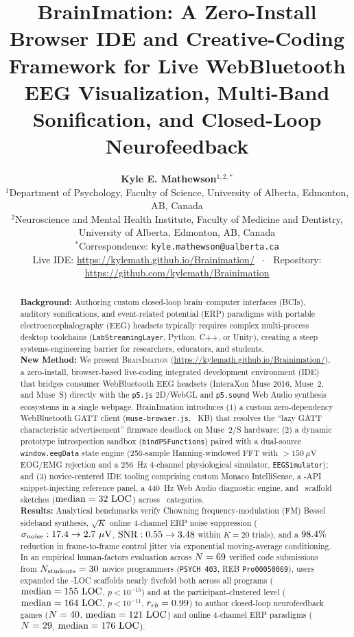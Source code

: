 \documentclass[10pt,twocolumn]{article}
\title{\textbf{BrainImation: A Zero-Install Browser IDE and Creative-Coding Framework for Live WebBluetooth EEG Visualization, Multi-Band Sonification, and Closed-Loop Neurofeedback}}
\author{
\textbf{Kyle E. Mathewson}$^{1,2,*}$\\[4pt]
\footnotesize $^1$Department of Psychology, Faculty of Science, University of Alberta, Edmonton, AB, Canada\\
\footnotesize $^2$Neuroscience and Mental Health Institute, Faculty of Medicine and Dentistry, University of Alberta, Edmonton, AB, Canada\\
\footnotesize $^*$Correspondence: \texttt{kyle.mathewson@ualberta.ca}\\
\footnotesize Live IDE: \url{https://kylemath.github.io/Brainimation/} \ $\cdot$ \ Repository: \url{https://github.com/kylemath/Brainimation}
}
\date{}
\begin{document}
\maketitle

\begin{abstract}
\noindent\textbf{Background:} Authoring custom closed-loop brain--computer interfaces (BCIs), auditory sonifications, and event-related potential (ERP) paradigms with portable electroencephalography (EEG) headsets typically requires complex multi-process desktop toolchains (\texttt{LabStreamingLayer}, Python, C++, or Unity), creating a steep systems-engineering barrier for researchers, educators, and students.\\
\noindent\textbf{New Method:} We present \textsc{BrainImation} (\url{https://kylemath.github.io/Brainimation/}), a zero-install, browser-based live-coding integrated development environment (IDE) that bridges consumer WebBluetooth EEG headsets (InteraXon Muse 2016, Muse~2, and Muse~S) directly with the \texttt{p5.js} 2D/WebGL and \texttt{p5.sound} Web Audio synthesis ecosystems in a single webpage. BrainImation introduces (1) a custom zero-dependency WebBluetooth GATT client (\texttt{muse-browser.js}, \MuseBrowserKB~KB) that resolves the ``lazy GATT characteristic advertisement'' firmware deadlock on Muse~2/S hardware; (2) a dynamic prototype introspection sandbox (\texttt{bindP5Functions}) paired with a dual-source \texttt{window.eegData} state engine (256-sample Hanning-windowed FFT with $>150\ \mu\text{V}$ EOG/EMG rejection and a 256~Hz 4-channel physiological simulator, \texttt{EEGSimulator}); and (3) novice-centered IDE tooling comprising custom Monaco IntelliSense, a \NRefAPIs-API snippet-injecting reference panel, a 440~Hz Web Audio diagnostic engine, and \NBuiltinExamples\ scaffold sketches ($\text{median} = 32\text{ LOC}$) across \NBuiltinCategories\ categories.\\
\noindent\textbf{Results:} Analytical benchmarks verify Chowning frequency-modulation (FM) Bessel sideband synthesis, $\sqrt{K}$ online 4-channel ERP noise suppression ($\sigma_{\text{noise}}: 17.4 \rightarrow 2.7\ \mu\text{V}$, $\text{SNR}: 0.55 \rightarrow 3.48$ within $K=20$ trials), and a $98.4\%$ reduction in frame-to-frame control jitter via exponential moving-average conditioning. In an empirical human-factors evaluation across $N = 69$ verified code submissions from $N_{\text{students}} = 30$ novice programmers (\texttt{PSYCH 403}, REB \texttt{Pro00050069}), users expanded the \ExLOCMedian-LOC scaffolds nearly fivefold both across all programs ($\text{median} = 155\text{ LOC}$, $p < 10^{-15}$) and at the participant-clustered level ($\text{median} = 164\text{ LOC}$, $p < 10^{-11}$, $r_{rb} = 0.99$) to author closed-loop neurofeedback games ($N = 40$, $\text{median} = 121\text{ LOC}$) and online 4-channel ERP paradigms ($N = 29$, $\text{median} = 176\text{ LOC}$).\\

\end{abstract}
\end{document}
